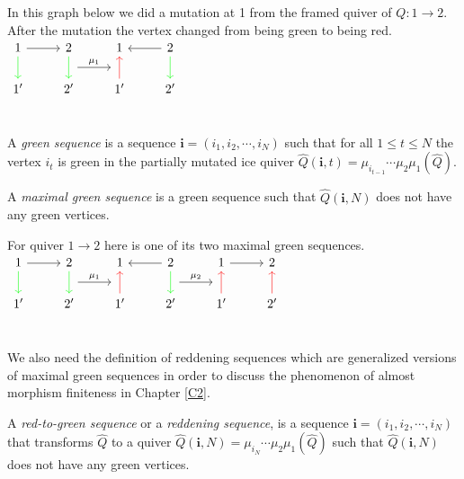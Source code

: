 \begin{example}
\indent In this graph below we did a mutation at 1 from the framed quiver of $Q: 1\to 2$. After the mutation the vertex changed from being green to being red.\\
$\begin{tikzcd}
1 \arrow[r] \arrow[green]{d} & 2\arrow[green]{d}\arrow[r,"\mu_1", shift right=3.5ex]  & 1&2\arrow[l]\arrow[green]{d}\\
1' & 2'&1'\arrow[red]{u}& 2'\\
\end{tikzcd}$
\end{example}
\begin{definition}
A \textit{green sequence} is a sequence $\mathbf{i}=(i_1, i_2,\cdots, i_N)$ such that for all $1\leq t\leq N$ the vertex $i_t$ is green in the partially mutated ice quiver $\hat{Q}(\mathbf{i},t)=\mu_{i_{t-1}}\cdots\mu_2\mu_1(\hat{Q})$.
\end{definition}
\begin{definition}
A \textit{maximal green sequence} is a green sequence such that $\hat{Q}(\mathbf{i},N)$ does not have any green vertices.
\end{definition}
\begin{example} For quiver $1\to 2$ here is one of its two maximal green sequences.\\
 $\begin{tikzcd}
1 \arrow[r] \arrow[d,green] & 2\arrow [d,green]\arrow[r,"\mu_1", shift right=3.5ex]  & 1&2\arrow[l]\arrow[d,green]\arrow[r,"\mu_2", shift right=3.5ex]&1\arrow[r] & 2\\
1' & 2'&1'\arrow[u,red]& 2'&1'\arrow[u,red] & 2'\arrow[u,red]\\
\end{tikzcd}$
\end{example}
\indent We also need the definition of reddening sequences which are generalized versions of maximal green sequences in order to discuss the phenomenon of almost morphism finiteness in Chapter \ref{C2}.\\
\begin{definition}
A \textit{red-to-green sequence} or a \textit{reddening sequence}, is a sequence $\mathbf{i}=(i_1, i_2,\cdots, i_N)$ that transforms $\hat{Q}$ to a quiver $\hat{Q}(\mathbf{i},N) = \mu_{i_N}\cdots\mu_2\mu_1(\hat{Q})$ such that $\hat{Q}(\mathbf{i},N)$ does not have any green vertices.\cite{Mul15}\\
\end{definition}
